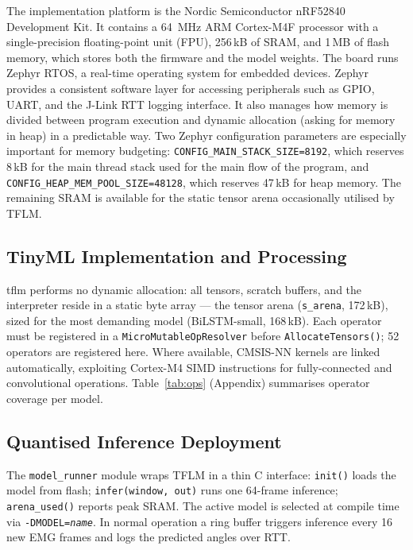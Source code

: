 \documentclass[11pt]{article}
\begin{document}
The implementation platform is the Nordic Semiconductor nRF52840 Development Kit. It contains a 64~MHz ARM Cortex-M4F processor with a single-precision floating-point unit (FPU), 256\,kB of SRAM, and 1\,MB of flash memory, which stores both the firmware and the model weights. The board runs Zephyr RTOS, a real-time operating system for embedded devices. Zephyr provides a consistent software layer for accessing peripherals such as GPIO, UART, and the J-Link RTT logging interface. It also manages how memory is divided between program execution and dynamic allocation (asking for memory in heap) in a predictable way. Two Zephyr configuration parameters are especially important for memory budgeting: \texttt{CONFIG\_MAIN\_STACK\_SIZE=8192}, which reserves 8\,kB for the main thread stack used for the main flow of the program, and \texttt{CONFIG\_HEAP\_MEM\_POOL\_SIZE=48128}, which reserves 47\,kB for heap memory. The remaining SRAM is available for the static tensor arena occasionally utilised by TFLM.

\subsection{TinyML Implementation and Processing}

\Gls{tflm} performs no dynamic allocation: all tensors, scratch buffers, and the interpreter reside in a static byte array — the tensor arena (\texttt{s\_arena}, 172\,kB), sized for the most demanding model (BiLSTM-small, 168\,kB). Each operator must be registered in a \texttt{MicroMutableOpResolver} before \texttt{AllocateTensors()}; 52 operators are registered here. Where available, CMSIS-NN kernels are linked automatically, exploiting Cortex-M4 SIMD instructions for fully-connected and convolutional operations. Table~\ref{tab:ops} (Appendix) summarises operator coverage per model.

\subsection{Quantised Inference Deployment}
\label{sec:fw_deployment}

The \texttt{model\_runner} module wraps TFLM in a thin C interface: \texttt{init()} loads the model from flash; \texttt{infer(window, out)} runs one 64-frame inference; \texttt{arena\_used()} reports peak SRAM. The active model is selected at compile time via \texttt{-DMODEL=\textit{name}}. In normal operation a ring buffer triggers inference every 16 new EMG frames and logs the predicted angles over RTT.
\end{document}
